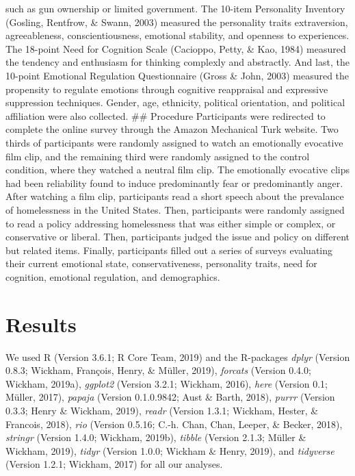 \documentclass[man,draftall]{apa6}
\begin{document}
such as gun ownership or limited government. The 10-item Personality
Inventory (Gosling, Rentfrow, \& Swann, 2003) measured the personality
traits extraversion, agreeableness, conscientiousness, emotional
stability, and openness to experiences. The 18-point Need for Cognition
Scale (Cacioppo, Petty, \& Kao, 1984) measured the tendency and
enthusiasm for thinking complexly and abstractly. And last, the 10-point
Emotional Regulation Questionnaire (Gross \& John, 2003) measured the
propensity to regulate emotions through cognitive reappraisal and
expressive suppression techniques. Gender, age, ethnicity, political
orientation, and political affiliation were also collected. \#\#
Procedure Participants were redirected to complete the online survey
through the Amazon Mechanical Turk website. Two thirds of participants
were randomly assigned to watch an emotionally evocative film clip, and
the remaining third were randomly assigned to the control condition,
where they watched a neutral film clip. The emotionally evocative clips
had been reliability found to induce predominantly fear or predominantly
anger. After watching a film clip, participants read a short speech
about the prevalance of homelessness in the United States. Then,
participants were randomly assigned to read a policy addressing
homelessness that was either simple or complex, or conservative or
liberal. Then, participants judged the issue and policy on different but
related items. Finally, participants filled out a series of surveys
evaluating their current emotional state, conservativeness, personality
traits, need for cognition, emotional regulation, and demographics.

\section{Results}\label{results}

We used R (Version 3.6.1; R Core Team, 2019) and the R-packages
\emph{dplyr} (Version 0.8.3; Wickham, François, Henry, \& Müller, 2019),
\emph{forcats} (Version 0.4.0; Wickham, 2019a), \emph{ggplot2} (Version
3.2.1; Wickham, 2016), \emph{here} (Version 0.1; Müller, 2017),
\emph{papaja} (Version 0.1.0.9842; Aust \& Barth, 2018), \emph{purrr}
(Version 0.3.3; Henry \& Wickham, 2019), \emph{readr} (Version 1.3.1;
Wickham, Hester, \& Francois, 2018), \emph{rio} (Version 0.5.16; C.-h.
Chan, Chan, Leeper, \& Becker, 2018), \emph{stringr} (Version 1.4.0;
Wickham, 2019b), \emph{tibble} (Version 2.1.3; Müller \& Wickham, 2019),
\emph{tidyr} (Version 1.0.0; Wickham \& Henry, 2019), and
\emph{tidyverse} (Version 1.2.1; Wickham, 2017) for all our analyses.
\end{document}
